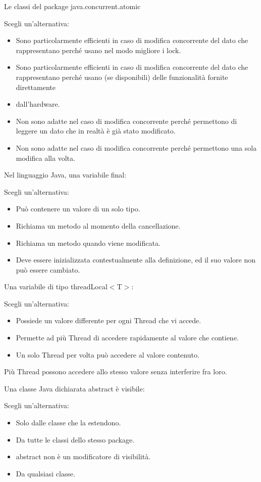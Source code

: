 \documentclass{article}
\begin{document}
Le classi del package java.concurrent.atomic

Scegli un'alternativa: 
\begin{itemize}
	\item Sono particolarmente efficienti in caso di modifica concorrente del dato che rappresentano perché usano nel modo migliore i lock.
	\item \checkmark Sono particolarmente efficienti in caso di modifica concorrente del dato che rappresentano perché usano (se disponibili) delle funzionalità fornite direttamente
	\item dall'hardware. 
	\item Non sono adatte nel caso di modifica concorrente perché permettono di leggere un dato che in realtà è già stato modificato.
	\item Non sono adatte nel caso di modifica concorrente perché permettono una sola modifica alla volta.
\end{itemize}

Nel linguaggio Java, una variabile final:

Scegli un'alternativa: 

\begin{itemize}
	\item Può contenere un valore di un solo tipo.
	\item Richiama un metodo al momento della cancellazione.
	\item Richiama un metodo quando viene modificata.
	\item \checkmark Deve essere inizializzata contestualmente alla definizione, ed il suo valore non può essere cambiato.
\end{itemize}

Una variabile di tipo threadLocal$< $T$ >$:

Scegli un'alternativa: 
\begin{itemize}
	\item \checkmark Possiede un valore differente per ogni Thread che vi accede.
	\item Permette ad più Thread di accedere rapidamente al valore che contiene.
	\item Un solo Thread per volta può accedere al valore contenuto.
\end{itemize}

Più Thread possono accedere allo stesso valore senza interferire fra loro.

Una classe Java dichiarata abstract è visibile:

Scegli un'alternativa: 
\begin{itemize}
	\item Solo dalle classe che la estendono.
	\item Da tutte le classi dello stesso package.
	\item \checkmark abstract non è un modificatore di visibilità.
	\item Da qualsiasi classe.
\end{itemize}
\end{document}

